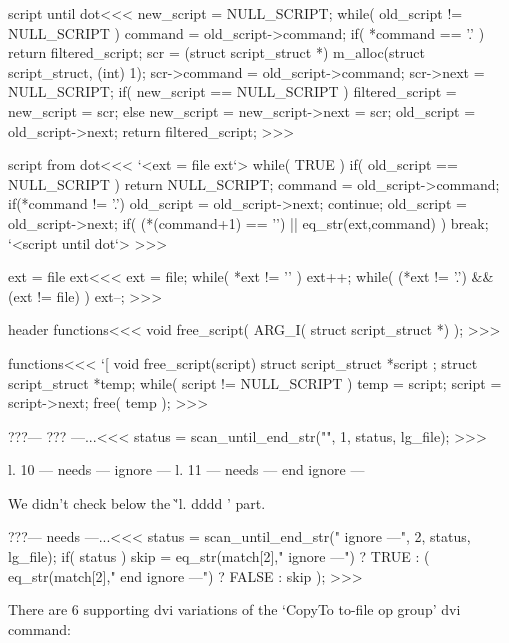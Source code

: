 \<script until dot\><<<
new_script = NULL_SCRIPT;
while( old_script != NULL_SCRIPT ){
   command = old_script->command;
   if( *command == '.' ){ return filtered_script; }
   scr = (struct script_struct *)
            m_alloc(struct script_struct, (int) 1);   
   scr->command = old_script->command;
   scr->next = NULL_SCRIPT;
   if( new_script == NULL_SCRIPT ){
     filtered_script = new_script = scr;
   } else {
     new_script = new_script->next = scr;
   }
   old_script = old_script->next;
}
return filtered_script;
>>>

\<script from dot\><<<
`<ext = file ext`>
while( TRUE ){ 
  if( old_script == NULL_SCRIPT ){
     return NULL_SCRIPT;
  }
  command = old_script->command;
  if(*command != '.') {
    old_script = old_script->next;
    continue;
  }
  old_script = old_script->next;
  if( (*(command+1) == '\0') || eq_str(ext,command) ){
    break;
  }
}
`<script until dot`> 
>>>


\<ext = file ext\><<<
ext = file;
while( *ext != '\0' ){ ext++; }
while( (*ext != '.') && (ext != file) ){ ext--; }
>>>


\<header functions\><<<
void free_script(
        ARG_I( struct script_struct  *) );
>>>

\<functions\><<<
`[
void free_script(script) 
                                   struct script_struct *script
;{                                         
                                   struct script_struct *temp;
  while( script != NULL_SCRIPT ){
    temp = script;
    script = script->next;
    free( temp );
  }
}
>>>




\<???--- ??? ---...\><<<
status = scan_until_end_str("", 1, status, lg_file);
>>>


\Verbatim
l. 10 --- needs --- ignore ---
l. 11 --- needs --- end ignore ---
\EndVerbatim


We didn't check below the \`'l. dddd ' part.

\<???--- needs ---...\><<<
status = scan_until_end_str(" ignore ---", 2, status, lg_file);
if( status ){
  skip =  eq_str(match[2]," ignore ---") ? TRUE :
            ( eq_str(match[2]," end ignore ---") ? FALSE : skip );
}
>>>





There are 6 supporting dvi variations of the 
`CopyTo to-file op group'
 dvi command:

